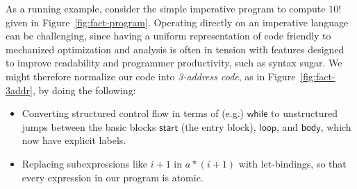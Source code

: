 \documentclass[acmsmall,screen,review]{acmart}
\newcommand{\ms}[1]{\ensuremath{\mathsf{#1}}}
\begin{document}
As a running example, consider the simple imperative program to compute $10!$ given in
Figure~\ref{fig:fact-program}. Operating directly on an imperative language can be challenging,
since having a uniform representation of code friendly to mechanized optimization and analysis is
often in tension with features designed to improve readability and programmer productivity, such as
syntax sugar. We might therefore normalize our code into \textit{3-address code}, as in
Figure~\ref{fig:fact-3addr}, by doing the following:
\begin{itemize}
  \item Converting structured control flow in terms of (e.g.) \ms{while} to unstructured jumps
  between the basic blocks \ms{start} (the entry block), \ms{loop}, and \ms{body}, which now have
  explicit labels. 
  \item Replacing subexpressions like $i + 1$ in $a * (i + 1)$ with let-bindings, so that every
  expression in our program is atomic. 
\end{itemize}
\end{document}
